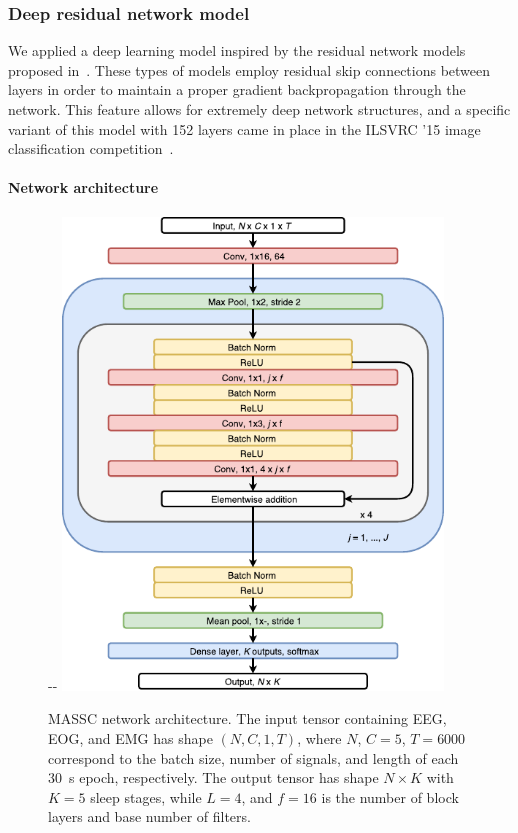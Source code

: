 \subsubsection{Deep residual network model}
We applied a deep learning model inspired by the residual network models proposed in~\cite{He2016,He2016b}.
These types of models employ residual skip connections between layers in order to maintain a proper gradient backpropagation through the network.
This feature allows for extremely deep network structures, and a specific variant of this model with 152 layers came in  place in the ILSVRC '15 image classification competition~\cite{He2016}.

\paragraph{Network architecture}
\begin{figure}[t]
    \begin{adjustwidth*}{}{-\marginparwidth-\marginparsep}
    \centering
    \includegraphics[width=0.9\textwidth]{figures/ResNet_EMBC_compressed.pdf}
    \caption[\acs{MASSC} network architecture]{\ac{MASSC} network architecture. The input tensor containing \ac{EEG}, \ac{EOG}, and \ac{EMG} has shape $(N, C, 1, T)$, where $N$, $C=5$, $T=6000$ correspond to the batch size, number of signals, and length of each \SI{30}{\second} epoch, respectively. The output tensor has shape $N\times K$ with $K=5$ sleep stages, while $L=4$, and $f=16$ is the number of block layers and base number of filters.}
    \label{fig:sleep-stages:network}
    \end{adjustwidth*}
\end{figure}
